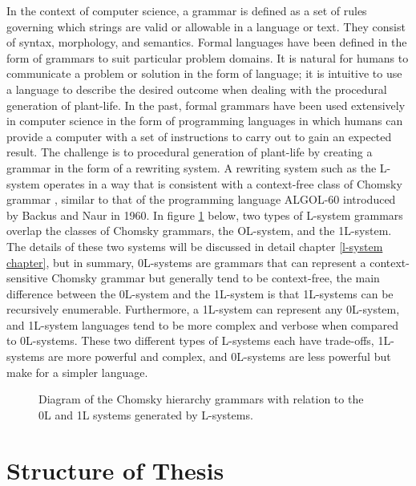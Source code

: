 In the context of computer science, a grammar is defined as a set of rules governing which strings are valid or allowable in a language or text. They consist of syntax, morphology, and semantics. Formal languages have been defined in the form of grammars to suit particular problem domains. It is natural for humans to communicate a problem or solution in the form of language; it is intuitive to use a language to describe the desired outcome when dealing with the procedural generation of plant-life. In the past, formal grammars have been used extensively in computer science in the form of programming languages in which humans can provide a computer with a set of instructions to carry out to gain an expected result. The challenge is to procedural generation of plant-life by creating a  grammar in the form of a rewriting system. A rewriting system such as the L-system operates in a way that is consistent with a context-free class of Chomsky grammar \cite{chomsky1956three}, similar to that of the programming language ALGOL-60 introduced by Backus and Naur in  1960\cite{backus1960report}. In figure \ref{chomsky grammars} below, two types of L-system grammars overlap the classes of Chomsky grammars, the OL-system, and the 1L-system. The details of these two systems will be discussed in detail chapter \ref{l-system chapter}, but in summary, 0L-systems are grammars that can represent a context-sensitive Chomsky grammar but generally tend to be context-free, the main difference between the 0L-system and the 1L-system is that 1L-systems can be recursively enumerable. Furthermore, a 1L-system can represent any 0L-system, and 1L-system languages tend to be more complex and verbose when compared to 0L-systems. These two different types of L-systems each have trade-offs, 1L-systems are more powerful and complex, and 0L-systems are less powerful but make for a simpler language. 

\begin{figure}[htbp]
	{\centering
		\setlength{\fboxrule}{1pt}
		\vspace{7px}
		\caption{Diagram of the Chomsky hierarchy grammars with relation to the 0L and 1L systems generated by L-systems.} \label{chomsky grammars}
	}
\end{figure}
\FloatBarrier

\newpage

\section{Structure of Thesis}

